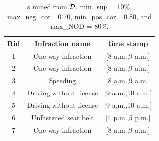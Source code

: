 \begin{table}[th!]
\caption{\MGI{}s mined from $\cal{D}$. min\_sup = 10\%, max\_neg\_cor= 0.70, min\_pos\_cor= 0.80, and max\_NOD = 80\%.} \label{tab:exampleMGI}
\centering
\hspace{-1.5cm}
\begin{tabular}{|c||c|c|}
\hline {\bf Rid} & {\bf Infraction name} & {\bf time stamp} \\
\hline
\hline 1 & One-way infraction & [8 a.m.,9 a.m.] \\
\hline 2 & One-way infraction & [8 a.m.,9 a.m.] \\
\hline 3 & Speeding & [8 a.m.,9 a.m.] \\
\hline 4 & Driving without license & [9 a.m.,10 a.m.] \\
\hline 5 & Driving without license & [9 a.m.,10 a.m.] \\
\hline 6 & Unfastened seat belt & [4 p.m.,5 p.m.] \\
\hline 7 & One-way infraction & [8 a.m.,9 a.m.] \\
\hline
\end{tabular}
\end{table}

%
%


